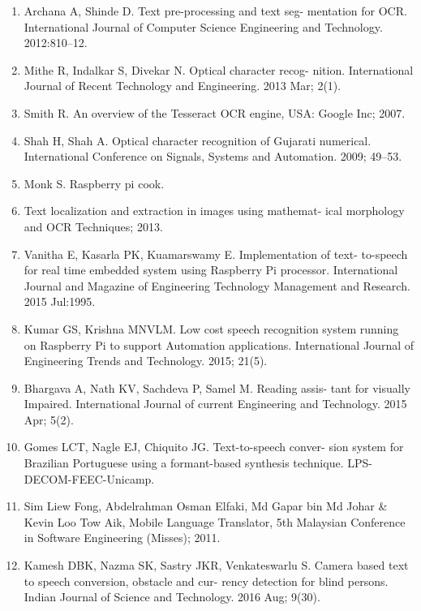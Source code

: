 \documentclass[a4paper]{article}
\begin{document}
\begin{enumerate}
    \item Archana A, Shinde D. Text pre-processing and text seg- mentation for OCR. International Journal of Computer Science Engineering and Technology. 2012:810–12.

    \item Mithe R, Indalkar S, Divekar N. Optical character recog- nition. International Journal of Recent Technology and Engineering. 2013 Mar; 2(1).

    \item Smith R. An overview of the Tesseract OCR engine, USA: Google Inc; 2007.

    \item Shah H, Shah A. Optical character recognition of Gujarati numerical. International Conference on Signals, Systems and Automation. 2009; 49–53.

    \item Monk S. Raspberry pi cook.
    \item Text localization and extraction in images using mathemat- ical morphology and OCR Techniques; 2013.
    \item Vanitha E, Kasarla PK, Kuamarswamy E. Implementation of text- to-speech for real time embedded system using Raspberry Pi processor. International Journal and Magazine of Engineering Technology Management and Research. 2015 Jul:1995.
    \item Kumar GS, Krishna MNVLM. Low cost speech recognition system running on Raspberry Pi to support Automation applications. International Journal of Engineering Trends and Technology. 2015; 21(5).
    \item Bhargava A, Nath KV, Sachdeva P, Samel M. Reading assis- tant for visually Impaired. International Journal of current Engineering and Technology. 2015 Apr; 5(2).

    \item Gomes LCT, Nagle EJ, Chiquito JG. Text-to-speech conver- sion system for Brazilian Portuguese using a formant-based synthesis technique. LPS-DECOM-FEEC-Unicamp.
    
    \item Sim Liew Fong, Abdelrahman Osman Elfaki, Md Gapar bin Md Johar \& Kevin Loo Tow Aik, Mobile Language Translator, 5th Malaysian Conference in Software Engineering (Misses); 2011.
    
    \item Kamesh DBK, Nazma SK, Sastry JKR, Venkateswarlu S. Camera based text to speech conversion, obstacle and cur- rency detection for blind persons. Indian Journal of Science and Technology. 2016 Aug; 9(30).
\end{enumerate}
 
\end{document}
